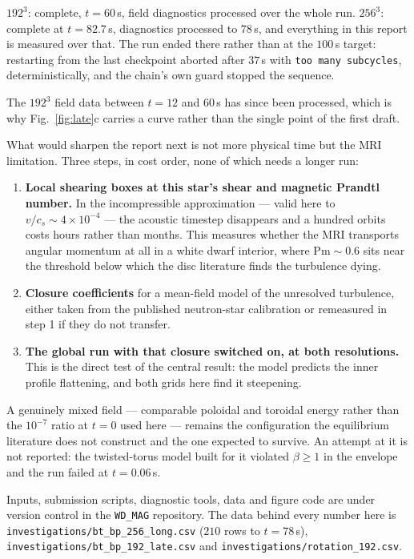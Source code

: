 \documentclass[11pt,a4paper]{article}
\begin{document}
$192^3$: complete, $t = 60$\,s, field diagnostics processed over the whole run.
\quad $256^3$: complete at $t = 82.7$\,s, diagnostics processed to $78$\,s, and
everything in this report is measured over that. The run ended there rather than
at the $100$\,s target: restarting from the last checkpoint aborted after
$37$\,s with \texttt{too many subcycles}, deterministically, and the chain's
own guard stopped the sequence.

The $192^3$ field data between $t = 12$ and $60$\,s has since been processed,
which is why Fig.~\ref{fig:late}c carries a curve rather than the single point
of the first draft.

What would sharpen the report next is not more physical time but the MRI
limitation. Three steps, in cost order, none of which needs a longer run:

\begin{enumerate}\itemsep2pt
\item \textbf{Local shearing boxes at this star's shear and magnetic Prandtl
      number.} In the incompressible approximation --- valid here to
      $v/c_s \sim 4\times10^{-4}$ --- the acoustic timestep disappears and a
      hundred orbits costs hours rather than months. This measures whether the
      MRI transports angular momentum at all in a white dwarf interior, where
      $\mathrm{Pm} \sim 0.6$ sits near the threshold below which the disc
      literature finds the turbulence dying.
\item \textbf{Closure coefficients} for a mean-field model of the unresolved
      turbulence, either taken from the published neutron-star calibration or
      remeasured in step 1 if they do not transfer.
\item \textbf{The global run with that closure switched on, at both
      resolutions.} This is the direct test of the central result: the model
      predicts the inner profile flattening, and both grids here find it
      steepening.
\end{enumerate}

A genuinely mixed field --- comparable poloidal and toroidal energy rather than
the $10^{-7}$ ratio at $t=0$ used here --- remains the configuration the
equilibrium literature does not construct and the one expected to survive. An
attempt at it is not reported: the twisted-torus model built for it violated
$\beta \ge 1$ in the envelope and the run failed at $t = 0.06$\,s.

\vspace{0.6em}
\noindent
Inputs, submission scripts, diagnostic tools, data and figure code are under
version control in the \texttt{WD\_MAG} repository. The data behind every number
here is \texttt{investigations/bt\_bp\_256\_long.csv} ($210$ rows to
$t = 78$\,s),
\texttt{investigations/bt\_bp\_192\_late.csv} and
\texttt{investigations/rotation\_192.csv}.
\end{document}
